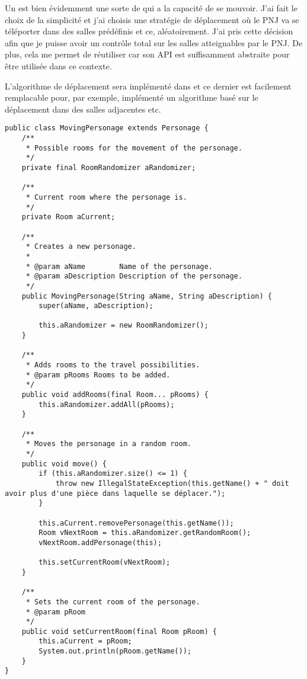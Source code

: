 \begin{exercise}[subtitle=Moving character]

Un  est bien évidemment une sorte de  qui a la capacité de se mouvoir. J'ai fait le choix de la simplicité et j'ai choisis une stratégie de déplacement où le PNJ va se téléporter dans des salles prédéfinis et ce, aléatoirement. J'ai pris cette décision afin que je puisse avoir un contrôle total sur les salles atteignables par le PNJ. De plus, cela me permet de réutiliser  car son API est suffisamment abstraite pour être utilisée dans ce contexte.

L'algorithme de déplacement sera implémenté dans  et ce dernier est facilement remplacable pour, par exemple, implémenté un algorithme basé sur le déplacement dans des salles adjacentes etc.

\begin{verbatim}
public class MovingPersonage extends Personage {
    /**
     * Possible rooms for the movement of the personage.
     */
    private final RoomRandomizer aRandomizer;

    /**
     * Current room where the personage is.
     */
    private Room aCurrent;

    /**
     * Creates a new personage.
     *
     * @param aName        Name of the personage.
     * @param aDescription Description of the personage.
     */
    public MovingPersonage(String aName, String aDescription) {
        super(aName, aDescription);

        this.aRandomizer = new RoomRandomizer();
    }

    /**
     * Adds rooms to the travel possibilities.
     * @param pRooms Rooms to be added.
     */
    public void addRooms(final Room... pRooms) {
        this.aRandomizer.addAll(pRooms);
    }

    /**
     * Moves the personage in a random room.
     */
    public void move() {
        if (this.aRandomizer.size() <= 1) {
            throw new IllegalStateException(this.getName() + " doit avoir plus d'une pièce dans laquelle se déplacer.");
        }

        this.aCurrent.removePersonage(this.getName());
        Room vNextRoom = this.aRandomizer.getRandomRoom();
        vNextRoom.addPersonage(this);

        this.setCurrentRoom(vNextRoom);
    }

    /**
     * Sets the current room of the personage.
     * @param pRoom
     */
    public void setCurrentRoom(final Room pRoom) {
        this.aCurrent = pRoom;
        System.out.println(pRoom.getName());
    }
}
\end{verbatim}


\end{exercise}
